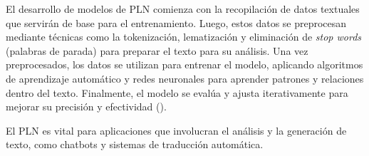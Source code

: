 El desarrollo de modelos de PLN comienza con la recopilación de datos textuales que servirán de base para el entrenamiento. Luego, estos datos se preprocesan mediante técnicas como la tokenización, lematización y eliminación de \textit{stop words} (palabras de parada) para preparar el texto para su análisis. Una vez preprocesados, los datos se utilizan para entrenar el modelo, aplicando algoritmos de aprendizaje automático y redes neuronales para aprender patrones y relaciones dentro del texto. Finalmente, el modelo se evalúa y ajusta iterativamente para mejorar su precisión y efectividad (\cite{schutze2008introduction}).

El PLN es vital para aplicaciones que involucran el análisis y la generación de texto, como chatbots y sistemas de traducción automática.

